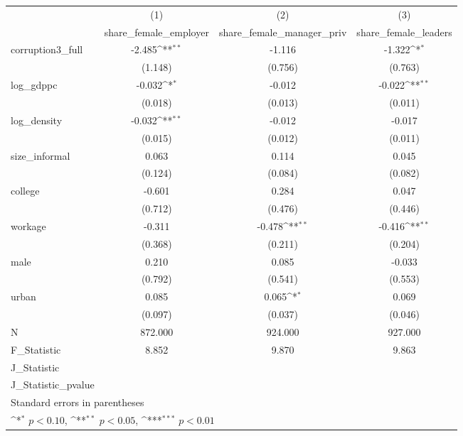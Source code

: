 {
\def\sym#1{\ifmmode^{#1}\else\(^{#1}\)\fi}
\begin{tabular}{l*{3}{c}}
\hline\hline
            &\multicolumn{1}{c}{(1)}&\multicolumn{1}{c}{(2)}&\multicolumn{1}{c}{(3)}\\
            &\multicolumn{1}{c}{share\_female\_employer}&\multicolumn{1}{c}{share\_female\_manager\_priv}&\multicolumn{1}{c}{share\_female\_leaders}\\
\hline
corruption3\_full&      -2.485\sym{**} &      -1.116         &      -1.322\sym{*}  \\
            &     (1.148)         &     (0.756)         &     (0.763)         \\
[1em]
log\_gdppc   &      -0.032\sym{*}  &      -0.012         &      -0.022\sym{**} \\
            &     (0.018)         &     (0.013)         &     (0.011)         \\
[1em]
log\_density &      -0.032\sym{**} &      -0.012         &      -0.017         \\
            &     (0.015)         &     (0.012)         &     (0.011)         \\
[1em]
size\_informal&       0.063         &       0.114         &       0.045         \\
            &     (0.124)         &     (0.084)         &     (0.082)         \\
[1em]
college     &      -0.601         &       0.284         &       0.047         \\
            &     (0.712)         &     (0.476)         &     (0.446)         \\
[1em]
workage     &      -0.311         &      -0.478\sym{**} &      -0.416\sym{**} \\
            &     (0.368)         &     (0.211)         &     (0.204)         \\
[1em]
male        &       0.210         &       0.085         &      -0.033         \\
            &     (0.792)         &     (0.541)         &     (0.553)         \\
[1em]
urban       &       0.085         &       0.065\sym{*}  &       0.069         \\
            &     (0.097)         &     (0.037)         &     (0.046)         \\
\hline
N           &     872.000         &     924.000         &     927.000         \\
F\_Statistic &       8.852         &       9.870         &       9.863         \\
J\_Statistic &                     &                     &                     \\
J\_Statistic\_pvalue&                     &                     &                     \\
\hline\hline
\multicolumn{4}{l}{\footnotesize Standard errors in parentheses}\\
\multicolumn{4}{l}{\footnotesize \sym{*} \(p<0.10\), \sym{**} \(p<0.05\), \sym{***} \(p<0.01\)}\\
\end{tabular}
}
